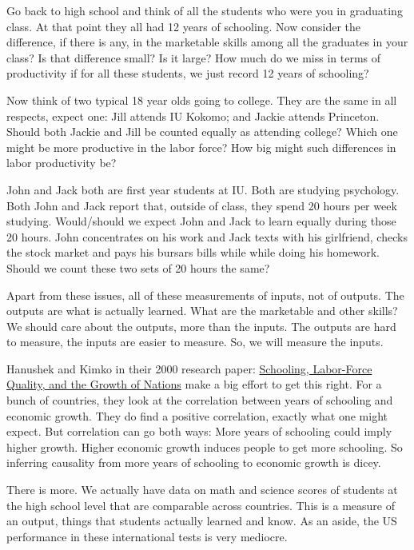 \documentclass[
]{book}
\begin{document}
Go back to high school and think of all the students who were you in graduating class. At that point they all had 12 years of schooling. Now consider the difference, if there is any, in the marketable skills among all the graduates in your class? Is that difference small? Is it large? How much do we miss in terms of productivity if for all these students, we just record 12 years of schooling?

Now think of two typical 18 year olds going to college. They are the same in all respects, expect one: Jill attends IU Kokomo; and Jackie attends Princeton. Should both Jackie and Jill be counted equally as attending college? Which one might be more productive in the labor force? How big might such differences in labor productivity be?

John and Jack both are first year students at IU. Both are studying psychology. Both John and Jack report that, outside of class, they spend 20 hours per week studying. Would/should we expect John and Jack to learn equally during those 20 hours. John concentrates on his work and Jack texts with his girlfriend, checks the stock market and pays his bursars bills while while doing his homework. Should we count these two sets of 20 hours the same?

Apart from these issues, all of these measurements of inputs, not of outputs. The outputs are what is actually learned. What are the marketable and other skills? We should care about the outputs, more than the inputs. The outputs are hard to measure, the inputs are easier to measure. So, we will measure the inputs.

Hanushek and Kimko in their 2000 research paper: \href{https://www.researchgate.net/profile/Eric-Hanushek/publication/4980899_Schooling_Labor-Force_Quality_and_the_Growth_of_Nations/links/551427960cf283ee0834ac50/Schooling-Labor-Force-Quality-and-the-Growth-of-Nations.pdf}{Schooling, Labor-Force Quality, and the Growth of Nations} make a big effort to get this right. For a bunch of countries, they look at the correlation between years of schooling and economic growth. They do find a positive correlation, exactly what one might expect. But correlation can go both ways: More years of schooling could imply higher growth. Higher economic growth induces people to get more schooling. So inferring causality from more years of schooling to economic growth is dicey.

There is more. We actually have data on math and science scores of students at the high school level that are comparable across countries. This is a measure of an output, things that students actually learned and know. As an aside, the US performance in these international tests is very mediocre.
\end{document}
